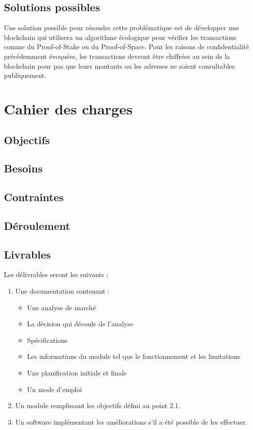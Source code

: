 \subsection*{Solutions possibles}

Une solution possible pour résoudre cette problématique est de développer une blockchain qui utilisera un algorithme écologique pour vérifier les transactions comme du Proof-of-Stake ou du Proof-of-Space. Pour les raisons de confidentialité précédemment évoquées, les transactions devront être chiffrées au sein de la blockchain pour pas que leurs montants ou les adresses ne soient consultables publiquement.

\section*{Cahier des charges}

\subsection*{Objectifs}

\subsection*{Besoins}

\subsection*{Contraintes}

\subsection*{Déroulement}

\subsection*{Livrables}
Les délivrables seront les suivants :
\begin{enumerate}
\item Une documentation contenant :
	\begin{itemize}
	\item Une analyse de marché
	\item La décision qui découle de l’analyse
	\item Spécifications
	\item Les informations du module tel que le fonctionnement et les limitations 
	\item Une planification initiale et finale
	\item Un mode d’emploi
	\end{itemize}
\item Un module remplissant les objectifs défini au point 2.1.
\item Un software implémentant les améliorations s’il a été possible de les effectuer.
\end{enumerate}
